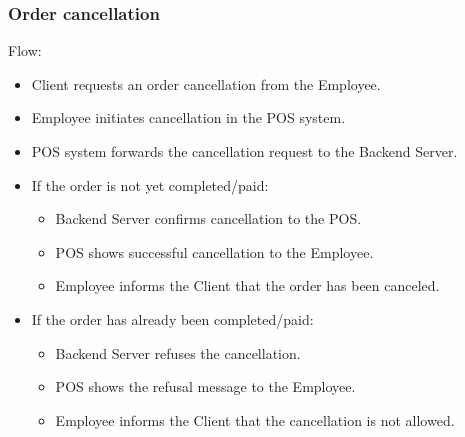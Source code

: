 \documentclass[]{VUMIFTemplateClass}
\begin{document}
\subsubsection{Order cancellation}

Flow:
\begin{itemize}
\setlength{\itemsep}{2pt}
\setlength{\parskip}{0pt}
\setlength{\parsep}{0pt}
\item Client requests an order cancellation from the Employee.
\item Employee initiates cancellation in the POS system.
\item POS system forwards the cancellation request to the Backend Server.
\item If the order is not yet completed/paid:
\begin{itemize}
\item Backend Server confirms cancellation to the POS.
\item POS shows successful cancellation to the Employee.
\item Employee informs the Client that the order has been canceled.
\end{itemize}
\item If the order has already been completed/paid:
\begin{itemize}
\item Backend Server refuses the cancellation.
\item POS shows the refusal message to the Employee.
\item Employee informs the Client that the cancellation is not allowed.
\end{itemize}
\end{itemize}
\end{document}
